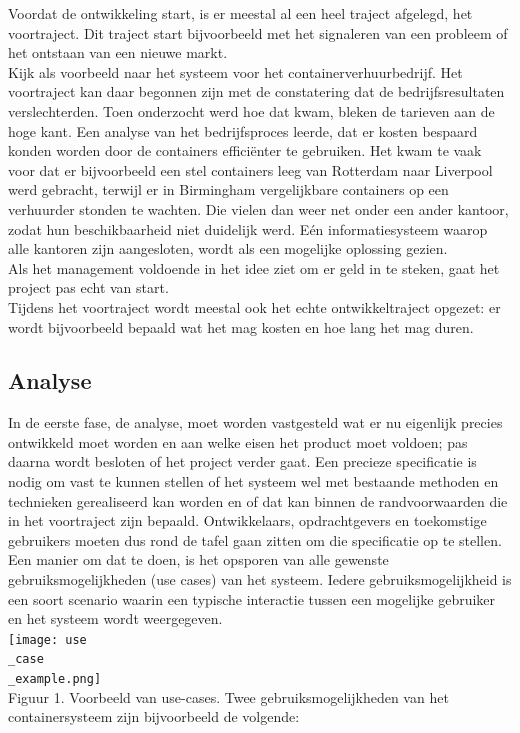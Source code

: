 \documentclass{article}
\begin{document}
	Voordat de ontwikkeling start, is er meestal al een heel traject afgelegd, het voortraject. Dit traject start bijvoorbeeld met het signaleren van een probleem of het ontstaan van een nieuwe markt. \\
	Kijk als voorbeeld naar het systeem voor het containerverhuurbedrijf. Het voortraject kan daar begonnen zijn met de constatering dat de	bedrijfsresultaten verslechterden. Toen onderzocht werd hoe dat kwam, bleken de tarieven aan de hoge kant. Een analyse van het bedrijfsproces 	leerde, dat er kosten bespaard konden worden door de containers effici\"{e}nter te gebruiken. Het kwam te vaak voor dat er bijvoorbeeld een stel containers leeg van Rotterdam naar Liverpool werd gebracht, terwijl 	er in Birmingham vergelijkbare containers op een verhuurder stonden te wachten. Die vielen dan weer net onder een ander kantoor, zodat hun beschikbaarheid niet duidelijk werd. Eén informatiesysteem waarop alle kantoren zijn aangesloten, wordt als een mogelijke oplossing gezien. \\
	Als het management voldoende in het idee ziet om er geld in te steken, gaat het project pas echt van start. \\
	Tijdens het voortraject wordt meestal ook het echte ontwikkeltraject opgezet: er wordt bijvoorbeeld bepaald wat het mag kosten en hoe lang het mag duren. \\
	
	\subsection{Analyse}
	
	In de eerste fase, de analyse, moet worden vastgesteld wat er nu eigenlijk precies ontwikkeld moet worden en aan welke eisen het product moet voldoen; pas daarna wordt besloten of het project verder gaat. Een precieze specificatie is nodig om vast te kunnen stellen of het systeem wel met bestaande methoden en technieken gerealiseerd kan worden en of dat kan binnen de randvoorwaarden die in het voortraject zijn bepaald. Ontwikkelaars, opdrachtgevers en toekomstige gebruikers moeten dus rond de tafel gaan zitten om die specificatie op te stellen. Een manier om dat te doen, is het opsporen van alle gewenste gebruiksmogelijkheden (use cases) van het systeem. Iedere gebruiksmogelijkheid is een soort scenario waarin een typische interactie tussen een mogelijke gebruiker en het systeem wordt weergegeven. \\
	
	\texttt{[image: use\\\_case\\\_example.png]} \\
	Figuur 1. Voorbeeld van use-cases.
	\newpage
	Twee gebruiksmogelijkheden van het containersysteem zijn bijvoorbeeld de volgende: \\
	
\end{document}
